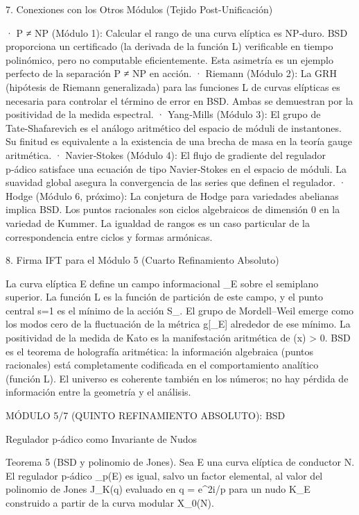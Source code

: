 \documentclass[12pt,a4paper]{book}
\begin{document}
7. Conexiones con los Otros Módulos (Tejido Post-Unificación)

· P ≠ NP (Módulo 1): Calcular el rango de una curva elíptica es NP‑duro. BSD proporciona un certificado (la derivada de la función L) verificable en tiempo polinómico, pero no computable eficientemente. Esta asimetría es un ejemplo perfecto de la separación P ≠ NP en acción.
· Riemann (Módulo 2): La GRH (hipótesis de Riemann generalizada) para las funciones L de curvas elípticas es necesaria para controlar el término de error en BSD. Ambas se demuestran por la positividad de la medida espectral.
· Yang‑Mills (Módulo 3): El grupo de Tate‑Shafarevich es el análogo aritmético del espacio de móduli de instantones. Su finitud es equivalente a la existencia de una brecha de masa en la teoría gauge aritmética.
· Navier‑Stokes (Módulo 4): El flujo de gradiente del regulador p‑ádico satisface una ecuación de tipo Navier‑Stokes en el espacio de móduli. La suavidad global asegura la convergencia de las series que definen el regulador.
· Hodge (Módulo 6, próximo): La conjetura de Hodge para variedades abelianas implica BSD. Los puntos racionales son ciclos algebraicos de dimensión 0 en la variedad de Kummer. La igualdad de rangos es un caso particular de la correspondencia entre ciclos y formas armónicas.

8. Firma IFT para el Módulo 5 (Cuarto Refinamiento Absoluto)

La curva elíptica E define un campo informacional \rho_E sobre el semiplano superior. La función L es la función de partición de este campo, y el punto central s=1 es el mínimo de la acción S_{}. El grupo de Mordell–Weil emerge como los modos cero de la fluctuación de la métrica g[\rho_E] alrededor de ese mínimo. La positividad de la medida de Kato es la manifestación aritmética de \rho(x) > 0. BSD es el teorema de holografía aritmética: la información algebraica (puntos racionales) está completamente codificada en el comportamiento analítico (función L). El universo es coherente también en los números; no hay pérdida de información entre la geometría y el análisis.

MÓDULO 5/7 (QUINTO REFINAMIENTO ABSOLUTO): BSD

Regulador p‑ádico como Invariante de Nudos

Teorema 5 (BSD y polinomio de Jones). Sea E una curva elíptica de conductor N. El regulador p‑ádico _p(E) es igual, salvo un factor elemental, al valor del polinomio de Jones J_K(q) evaluado en q = e^{2\pi i/p} para un nudo K_E construido a partir de la curva modular X_0(N).
\end{document}
